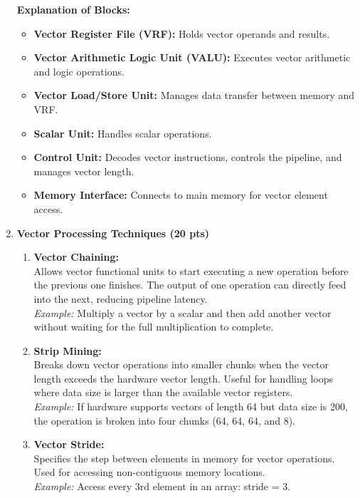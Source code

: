 \documentclass[11pt]{article}
\begin{document}
\begin{enumerate}
    \textbf{Explanation of Blocks:}
    \begin{itemize}
        \item \textbf{Vector Register File (VRF):} Holds vector operands and results.
        \item \textbf{Vector Arithmetic Logic Unit (VALU):} Executes vector arithmetic and logic operations.
        \item \textbf{Vector Load/Store Unit:} Manages data transfer between memory and VRF.
        \item \textbf{Scalar Unit:} Handles scalar operations.
        \item \textbf{Control Unit:} Decodes vector instructions, controls the pipeline, and manages vector length.
        \item \textbf{Memory Interface:} Connects to main memory for vector element access.
    \end{itemize}

    \item \textbf{Vector Processing Techniques (20 pts)} \\
    \begin{enumerate}[label=\alph*.]
        \item \textbf{Vector Chaining:} \\
        Allows vector functional units to start executing a new operation before the previous one finishes. The output of one operation can directly feed into the next, reducing pipeline latency.
        \\ \textit{Example:} Multiply a vector by a scalar and then add another vector without waiting for the full multiplication to complete.

        \item \textbf{Strip Mining:} \\
        Breaks down vector operations into smaller chunks when the vector length exceeds the hardware vector length. Useful for handling loops where data size is larger than the available vector registers.
        \\ \textit{Example:} If hardware supports vectors of length 64 but data size is 200, the operation is broken into four chunks (64, 64, 64, and 8).

        \item \textbf{Vector Stride:} \\
        Specifies the step between elements in memory for vector operations. Used for accessing non-contiguous memory locations.
        \\ \textit{Example:} Access every 3rd element in an array: stride = 3.


\end{enumerate}
\end{enumerate}
\end{document}
